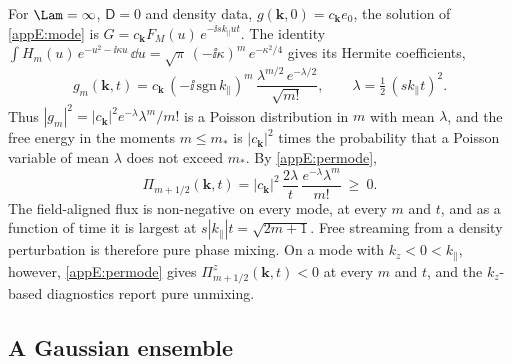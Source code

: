 For $\Lam=\infty$, $\mathsf D=0$ and density data, $g(\boldsymbol k,0)=c_{\boldsymbol k}e_0$, the solution of \eqref{appE:mode} is $G=c_{\boldsymbol k}F_M(u)\,e^{-\ii sk_\parallel ut}$. The identity $\int H_m(u)\,e^{-u^2-\ii\kappa u}\,\dd u=\sqrt\pi\,(-\ii\kappa)^m\,e^{-\kappa^2/4}$ gives its Hermite coefficients,
\begin{equation}\label{appE:poisson}
  g_m(\boldsymbol k,t)=c_{\boldsymbol k}\,(-\ii\,\mathrm{sgn}\,k_\parallel)^m\,\frac{\lambda^{m/2}\,e^{-\lambda/2}}{\sqrt{m!}},\qquad
  \lambda=\tfrac12\,(sk_\parallel t)^2 .
\end{equation}
Thus $|g_m|^2=|c_{\boldsymbol k}|^2e^{-\lambda}\lambda^m/m!$ is a Poisson distribution in $m$ with mean $\lambda$, and the free energy in the moments $m\le m_*$ is $|c_{\boldsymbol k}|^2$ times the probability that a Poisson variable of mean $\lambda$ does not exceed $m_*$. By \eqref{appE:permode},
\begin{equation}\label{appE:freeflux}
  \Pi_{m+1/2}(\boldsymbol k,t)=|c_{\boldsymbol k}|^2\,\frac{2\lambda}{t}\,\frac{e^{-\lambda}\lambda^m}{m!}\ \ge\ 0 .
\end{equation}
The field-aligned flux is non-negative on every mode, at every $m$ and $t$, and as a function of time it is largest at $s|k_\parallel|t=\sqrt{2m+1}$. Free streaming from a density perturbation is therefore pure phase mixing. On a mode with $k_z<0<k_\parallel$, however, \eqref{appE:permode} gives $\Pi^z_{m+1/2}(\boldsymbol k,t)<0$ at every $m$ and $t$, and the $k_z$-based diagnostics report pure unmixing.

\subsection{A Gaussian ensemble}\label{appE:sec-ensemble}

